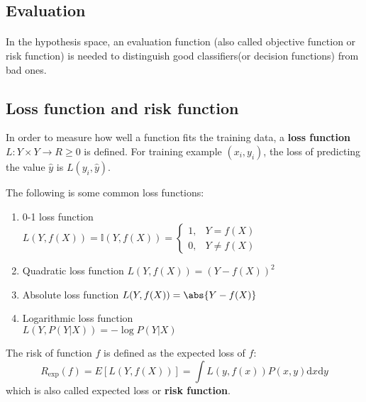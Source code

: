 \subsection{Evaluation}
\paragraph{}In the hypothesis space, an evaluation function (also called objective function or risk function) is needed to distinguish good classifiers(or decision functions) from bad ones.


\subsection{Loss function and risk function}

\begin{definition}
In order to measure how well a function fits the training data, a \textbf{loss function} $L:Y \times Y \rightarrow R \geq 0$ is defined. For training example $(x_i,y_i)$, the loss of predicting the value $\widehat{y}$ is $L(y_i,\widehat{y})$.
\end{definition}

The following is some common loss functions:
\begin{enumerate}
\item 0-1 loss function \\ $L(Y,f(X))=\mathbb{I}(Y,f(X))=\begin{cases} 1, & Y=f(X) \\ 0, & Y \neq f(X) \end{cases}$
\item Quadratic loss function $L(Y,f(X))=\left(Y-f(X)\right)^2$
\item Absolute loss function $L(Y,f(X))=\abs{Y-f(X)}$
\item Logarithmic loss function \\ $L(Y,P(Y|X))=-\log{P(Y|X)}$
\end{enumerate}

\begin{definition}
The risk of function $f$ is defined as the expected loss of $f$:
\begin{equation}\label{eqn:expected-loss}
R_{\mathrm{exp}}(f)=E\left[L\left(Y,f(X)\right)\right]=\int L\left(y,f(x)\right)P(x,y)\mathrm{d}x\mathrm{d}y
\end{equation}
which is also called expected loss or \textbf{risk function}.
\end{definition}

